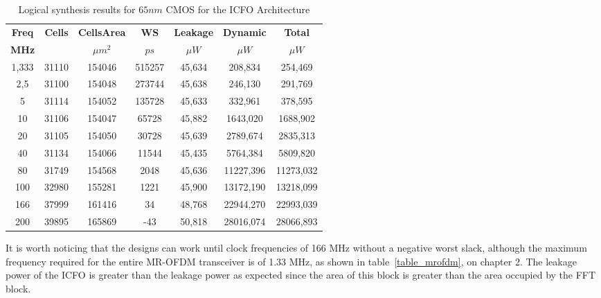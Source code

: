 \begin{table}[htb!]
\caption{Logical synthesis results for $65nm$ CMOS for the ICFO Architecture}
\label{table:results_logical_synthesis_icfo}
\centering
\begin{tabular}{c c c c c c c}
\toprule
\textbf{Freq} & \textbf{Cells} & \textbf{CellsArea} & \textbf{WS}  & \textbf{Leakage} 	& \textbf{Dynamic} & \textbf{Total} \\ 
\textbf{MHz}  &              & \boldmath${\mu}m^2$	& \boldmath$ps$ & \boldmath${\mu}W$ & \boldmath${\mu}W$ & \boldmath${\mu}W$ \\ \hline
1,333         & 31110	& 	154046      & 515257 	 &  45,634    &   208,834       &   254,469   \\
2,5	      &	31100	&	154048	    & 273744	 &  45,638    &	  246,130	&   291,769   \\
5	      &	31114	&	154052	    & 135728	 &  45,633    &	  332,961	&   378,595   \\
10	      &	31106	&	154047	    & 65728	 &  45,882    &	 1643,020	&  1688,902    \\
20	      &	31105	&	154050	    & 30728	 &  45,639    &	 2789,674	&  2835,313   \\
40	      &	31134	&	154066	    & 11544	 &  45,435    &	 5764,384	&  5809,820   \\
80	      &	31749	&	154568	    & 2048	 &  45,636    &	11227,396	& 11273,032   \\
100	      &	32980	&	155281	    & 1221	 &  45,900    &	13172,190	& 13218,099   \\
166	      &	37999	&	161416	    & 34	 &  48,768    &	22944,270	& 22993,039   \\
200	      &	39895	&	165869	    & -43	 &  50,818    &	28016,074	& 28066,893   \\ \hline
\end{tabular}
\end{table}


It is worth noticing that the designs can work until clock frequencies of 166 MHz without a negative worst slack, although the 
maximum frequency required for the entire MR-OFDM transceiver is of 1.33 MHz, as shown in table~\ref{table_mrofdm}, on chapter 2.
The leakage power of the ICFO is greater than the leakage power as expected since the area of this block is greater than the area occupied by the FFT block.  


